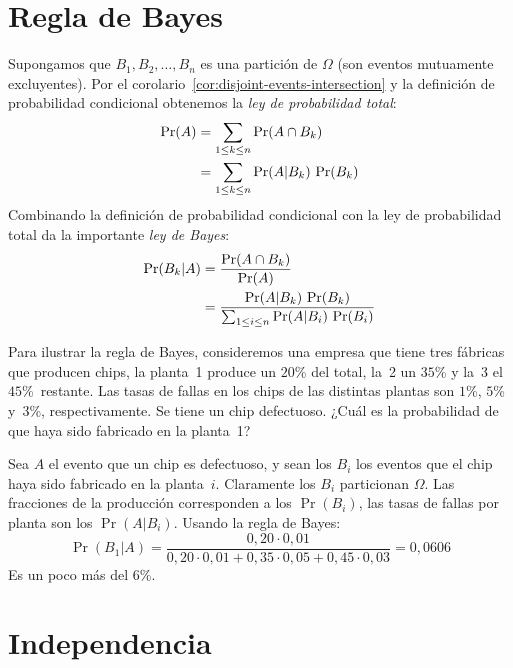 \section{Regla de Bayes}
\label{sec:regla-Bayes}

  Supongamos que \(B_1, B_2, \dotsc, B_n\)
  es una partición de \(\Omega\)
  (son eventos mutuamente excluyentes).
  Por el corolario~\ref{cor:disjoint-events-intersection}
  y la definición de probabilidad condicional
  obtenemos la \emph{ley de probabilidad total}:
  \begin{align}
    \Pr(A)
      &= \sum_{1 \le k \le n} \Pr(A \cap B_k) \notag \\
      &= \sum_{1 \le k \le n} \Pr(A \vert B_k) \, \Pr (B_k)
	   \label{eq:law-total-probability}
  \end{align}
  Combinando la definición de probabilidad condicional
  con la ley de probabilidad total
  da la importante \emph{ley de Bayes}:
  \begin{align}
    \Pr(B_k \vert A)
      &= \frac{\Pr(A \cap B_k)}{\Pr(A)} \notag \\
      &= \frac{\Pr(A \vert B_k) \, \Pr(B_k)}
	      {\sum_{1 \le i \le n}
		 \Pr(A \vert B_i) \, \Pr (B_i)}
	   \label{eq:Bayes-rule}
  \end{align}

  Para ilustrar la regla de Bayes,
  consideremos una empresa
  que tiene tres fábricas que producen chips,
  la planta~1 produce un \(20\)\% del total,
  la~2 un \(35\)\% y la~3 el \(45\)\%~restante.
  Las tasas de fallas en los chips de las distintas plantas son
  \(1\)\%,
  \(5\)\% y~\(3\)\%,
  respectivamente.
  Se tiene un chip defectuoso.
  ¿Cuál es la probabilidad
  de que haya sido fabricado en la planta~1?

  Sea \(A\) el evento que un chip es defectuoso,
  y sean los \(B_i\)
  los eventos que el chip haya sido fabricado en la planta~\(i\).
  Claramente los \(B_i\) particionan \(\Omega\).
  Las fracciones de la producción corresponden a los \(\Pr(B_i)\),
  las tasas de fallas por planta son los \(\Pr(A \vert B_i)\).
  Usando la regla de Bayes:
  \begin{equation*}
    \Pr(B_1 \vert A)
      = \frac{0,20 \cdot 0,01}
	     {0,20 \cdot 0,01 + 0,35 \cdot 0,05 + 0,45 \cdot 0,03}
      = 0,0606
  \end{equation*}
  Es un poco más del \(6\)\%.

\section{Independencia}
\label{sec:independencia}

